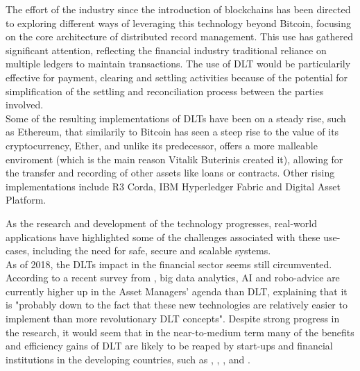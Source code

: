 The effort of the industry since the introduction of blockchains has been directed to exploring different ways of leveraging this technology beyond Bitcoin, focusing on the core architecture of distributed record management. This use has gathered significant attention, reflecting the financial industry traditional reliance on multiple ledgers to maintain transactions. The use of DLT would be particularily effective for payment, clearing and settling activities because of the potential for simplification of the settling and reconciliation process between the parties involved. \\

Some of the resulting implementations of DLTs have been on a steady rise, such as Ethereum, that similarily to Bitcoin has seen a steep rise to the value of its cryptocurrency, Ether, and unlike its predecessor, offers a more malleable enviroment (which is the main reason Vitalik Buterinis created it), allowing for the transfer and recording of other assets like loans or contracts. Other rising implementations include R3 Corda, IBM Hyperledger Fabric and Digital Asset Platform.

As the research and development of the technology progresses, real-world applications have highlighted some of the challenges associated with these use-cases, including the need for safe, secure and scalable systems. \\

As of 2018, the DLTs impact in the financial sector seems still circumvented. According to a recent survey from \cite{multifundssurvey}, big data analytics, AI and robo-advice are currently higher up in the Asset Managers' agenda than DLT, explaining that it is "probably down to the fact that these new technologies are relatively easier to implement than more revolutionary DLT concepts". Despite strong progress in the research, it would seem that in the near-to-medium term many of the benefits and efficiency gains of DLT are likely to be reaped by start-ups and financial institutions in the developing countries, such as \cite{abracompany}, \cite{ripplecompany}, \cite{chaincompany}, \cite{bitpesacompany} and \cite{shocardcompany}. \\


